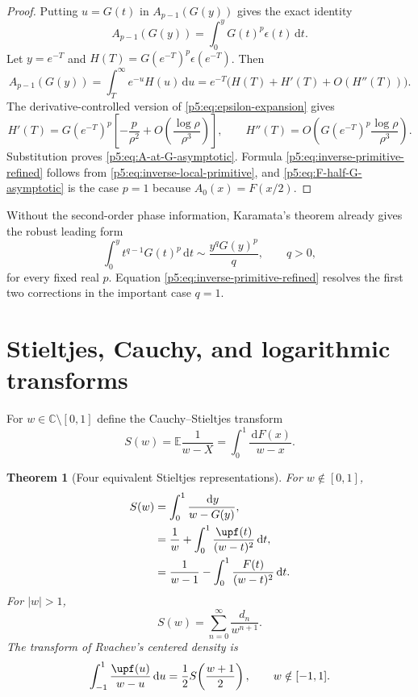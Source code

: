 \documentclass[11pt,oneside]{article}
\newtheorem{theorem}{Theorem}[section]
\theoremstyle{definition}
\theoremstyle{remark}
\newcommand{\E}{\mathbb E}
\newcommand{\C}{\mathbb C}
\newcommand{\dd}{\,\mathrm d}
\newcommand{\1}{\mathbf 1}
\begin{document}
\begin{proof}
Putting $u=G(t)$ in $A_{p-1}(G(y))$ gives the exact identity
\begin{equation}\label{p5:eq:A-G-epsilon}
 A_{p-1}(G(y))=\int_0^yG(t)^p\epsilon(t)\dd t.
\end{equation}
Let $y=e^{-T}$ and $H(T)=G(e^{-T})^p\epsilon(e^{-T})$.  Then
\[
 A_{p-1}(G(y))=\int_T^\infty e^{-u}H(u)\dd u
 =e^{-T}\bigl(H(T)+H'(T)+O(H''(T))\bigr).
\]
The derivative-controlled version of \eqref{p5:eq:epsilon-expansion} gives
\[
 H'(T)=G(e^{-T})^p\left[-\frac p{\rho^2}
 +O\!\left(\frac{\log\rho}{\rho^3}\right)\right],
 \qquad
 H''(T)=O\!\left(G(e^{-T})^p\frac{\log\rho}{\rho^3}\right).
\]
Substitution proves \eqref{p5:eq:A-at-G-asymptotic}.  Formula \eqref{p5:eq:inverse-primitive-refined} follows from \eqref{p5:eq:inverse-local-primitive}, and \eqref{p5:eq:F-half-G-asymptotic} is the case $p=1$ because $A_0(x)=F(x/2)$.
\end{proof}

Without the second-order phase information, Karamata's theorem already gives the robust leading form
\begin{equation}\label{p5:eq:inverse-primitive-Karamata}
 \int_0^y t^{q-1}G(t)^p\dd t
 \sim\frac{y^qG(y)^p}{q},
 \qquad q>0,
\end{equation}
for every fixed real $p$.  Equation \eqref{p5:eq:inverse-primitive-refined} resolves the first two corrections in the important case $q=1$.

\section{Stieltjes, Cauchy, and logarithmic transforms}\label{p5:sec:stieltjes}

For $w\in\C\setminus[0,1]$ define the Cauchy--Stieltjes transform
\begin{equation}\label{p5:eq:S-def}
 S(w)=\E\frac1{w-X}
 =\int_0^1\frac{\dd F(x)}{w-x}.
\end{equation}

\begin{theorem}[Four equivalent Stieltjes representations]\label{p5:thm:stieltjes-representations}
For $w\notin[0,1]$,
\begin{align}
 S(w)
 &=\int_0^1\frac{\dd y}{w-G(y)},\label{p5:eq:S-quantile}\\
 &=\frac1w+\int_0^1\frac{\upf(t)}{(w-t)^2}\dd t,\label{p5:eq:S-up}\\
 &=\frac1{w-1}-\int_0^1\frac{F(t)}{(w-t)^2}\dd t.\label{p5:eq:S-F}
\end{align}
For $|w|>1$,
\begin{equation}\label{p5:eq:S-moment-series}
 S(w)=\sum_{n=0}^{\infty}\frac{d_n}{w^{n+1}}.
\end{equation}
The transform of Rvachev's centered density is
\begin{equation}\label{p5:eq:Cauchy-up}
 \int_{-1}^{1}\frac{\upf(u)}{w-u}\dd u
 =\frac12S\!\left(\frac{w+1}{2}\right),
 \qquad w\notin[-1,1].
\end{equation}
\end{theorem}
\end{document}
